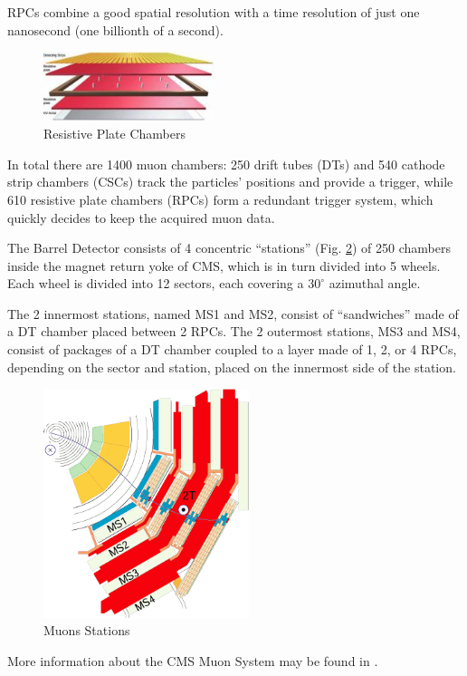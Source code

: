 RPCs combine a good spatial resolution with a time resolution of just one nanosecond (one billionth of a second).
\begin{figure}[H]
  \centering
\includegraphics[width=5cm]{CMS_chapter_plots/RPClayers}
  \caption{Resistive Plate Chambers \label{fig:RPClayers}}
\end{figure}


In total there are 1400 muon chambers: 250 drift tubes (DTs) and 540 cathode strip chambers (CSCs) track the particles’ positions and provide a trigger, while 610 resistive plate chambers (RPCs) form a redundant trigger system, which quickly decides to keep the acquired muon data.

The Barrel Detector consists of 4 concentric “stations” (Fig. \ref{fig:mustations}) of 250 chambers inside the magnet return yoke of CMS, which is in turn divided into 5 wheels. Each wheel is divided into 12 sectors, each covering a $30^{\circ}$ azimuthal angle.

The 2 innermost stations, named MS1 and MS2, consist of “sandwiches” made of a DT chamber placed between 2 RPCs. The 2 outermost stations, MS3 and MS4, consist of packages of a DT chamber coupled to a layer made of 1, 2, or 4 RPCs, depending on the sector and station, placed on the innermost side of the station.

\begin{figure}[H]
  \centering
\includegraphics[width=6cm]{CMS_chapter_plots/mustations}
  \caption{Muons Stations \label{fig:mustations}}
\end{figure}

More information about the CMS Muon System may be found in \cite{MUON}.

